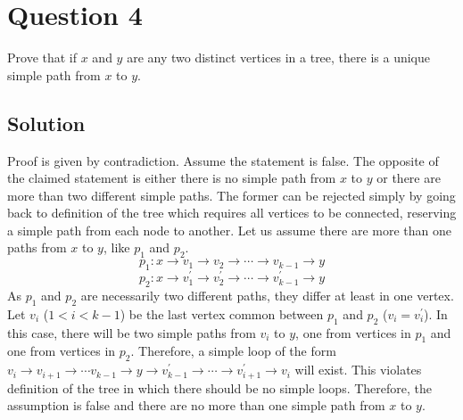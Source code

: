 
\section*{Question 4}
Prove that if $x$ and $y$ are any two distinct vertices in a tree, there is a unique simple path from $x$ to $y$.
\subsection*{Solution}
Proof is given by contradiction. Assume the statement is false. The opposite of the claimed statement is either there is no simple path from $x$ to $y$ or there are more than two different simple paths. The former can be rejected simply by going back to definition of the tree which requires all vertices to be connected, reserving a simple path from each node to another. Let us assume there are more than one paths from $x$ to $y$, like $p_1$ and $p_2$.
\begin{equation}
p_1: x \rightarrow v_1 \rightarrow v_2 \rightarrow \cdots \rightarrow v_{k-1} \rightarrow y
\end{equation}
\begin{equation}
p_2: x \rightarrow v_{1}^{\prime} \rightarrow v_{2}^{\prime} \rightarrow \cdots \rightarrow v_{k-1}^{\prime} \rightarrow y
\end{equation}
As $p_1$ and $p_2$ are necessarily two different paths, they differ at least in one vertex. Let $v_i$ ($1<i<k-1$) be the last vertex common between $p_1$ and $p_2$ ($v_i = v_{i}^{\prime}$). In this case, there will be two simple paths from $v_i$ to $y$, one from vertices in $p_1$ and one from vertices in $p_2$. Therefore, a simple loop of the form $v_i \rightarrow v_{i+1} \rightarrow \cdots v_{k-1} \rightarrow y \rightarrow v_{k-1}^{\prime} \rightarrow \cdots \rightarrow v_{i+1}^{\prime} \rightarrow v_i$ will exist. This violates definition of the tree in which there should be no simple loops. Therefore, the assumption is false and there are no more than one simple path from $x$ to $y$.
